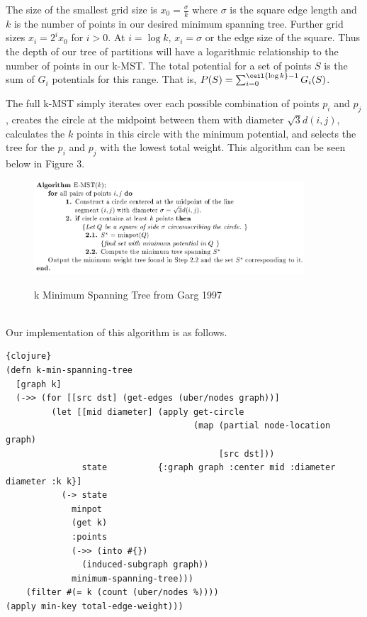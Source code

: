 \documentclass{article}
\begin{document}
The size of the smallest grid size is $x_0 = \frac{\sigma}{k}$  where $\sigma$ is the square edge length and $k$ is the number of points in our desired minimum spanning tree.
Further grid sizes $x_i = 2^ix_0$ for $i > 0$.
At $i = \log k$, $x_i = \sigma$ or the edge size of the square.
Thus the depth of our tree of partitions will have a logarithmic relationship to the number of points in our k-MST.
The total potential for a set of points $S$ is the sum of $G_i$ potentials for this range.
That is, $P(S) = \sum_{i=0}^{\ceil{\log k} - 1} G_i(S)$.

The full k-MST simply iterates over each possible combination of points $p_i$ and $p_j$, creates the circle at the midpoint between them with diameter $\sqrt{3}d(i,j)$, calculates the $k$ points in this circle with the minimum potential, and selects the tree for the $p_i$ and $p_j$ with the lowest total weight.
This algorithm can be seen below in Figure 3.

\begin{figure}[h]
\centering
\includegraphics[width=0.9\textwidth]{k-mst.png}
\label{k-MST}
\caption{k Minimum Spanning Tree from Garg 1997}
\end{figure}\\

Our implementation of this algorithm is as follows.

\begin{lstlisting}{clojure}
(defn k-min-spanning-tree
  [graph k]
  (->> (for [[src dst] (get-edges (uber/nodes graph))]
         (let [[mid diameter] (apply get-circle
                                     (map (partial node-location graph)
                                          [src dst]))
               state          {:graph graph :center mid :diameter diameter :k k}]
           (-> state
             minpot
             (get k)
             :points
             (->> (into #{})
               (induced-subgraph graph))
             minimum-spanning-tree)))
    (filter #(= k (count (uber/nodes %))))
(apply min-key total-edge-weight)))
\end{lstlisting}
\end{document}
